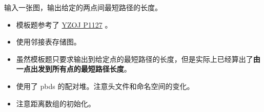 \noindent 输入一张图，输出给定的两点间最短路径的长度。

\begin{itemize}
    \item 模板题参考了 \href{https://oiproxy.bugminer.top/OnlineJudge/problem_show.php?id=1127}{YZOJ P1127} 。
    \item 使用邻接表存储图。
    \item 虽然模板题只要求输出到给定点的最短路径的长度，但是实际上已经算出了\textbf{由一点出发到所有点的最短路径长度}。
    \item 使用了 pbds 的配对堆。注意头文件和命名空间的变化。
    \item 注意距离数组的初始化。
\end{itemize}